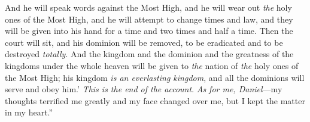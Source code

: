 \begin{biblechapter}
\verse And he will speak words against the Most High, and he will wear out \textit{the} holy ones of the Most High, and he will attempt to change times and law, and they will be given into his hand for a time and two times and half a time.
\verse Then the court will sit, and his dominion will be removed, to be eradicated and to be destroyed \textit{totally}.
\verse And the kingdom and the dominion and the greatness of the kingdoms under the whole heaven will be given to \textit{the} nation of \textit{the} holy ones of the Most High; his kingdom \textit{is an everlasting kingdom}, and all the dominions will serve and obey him.’
\verse \textit{This is the end of the account}. \textit{As for me, Daniel}—my thoughts terrified me greatly and my face changed over me, but I kept the matter in my heart.”
\end{biblechapter}

